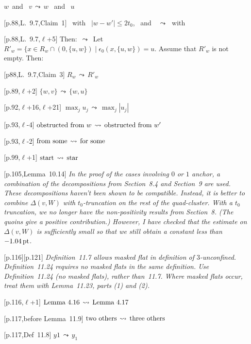 \documentclass[11pt]{amsart}
\def\op#1{{\text{#1}}}
\def\lto{\ensuremath{\,\leadsto\,}}
\def\line{$\ell$}
\def\text{\hbox}
\def\sz{small} %
\begin{document}
\begin{\sz}
[p.88,Lemma~9.7,\line+2] 
	$w$\text{ and } $v$\lto $w$ \text{ and } $u$

	
[p.88,L.~9.7,Claim~1]
	\text{ with } $|w - w'|\le 2t_0$, \text{ and }
	\lto \text{ with }

	
[p.88,L.~9.7,\line+5]
         Then: $\lto$ Let
          $
          R'_w = \{x\in R_w \cap(0,\{u,w\})\mid 
          \epsilon_0(x,\{u,w\}) = u.
          $
          Assume that $R'_w$ is not empty. Then:

[p88,L.~9.7,Claim~3]
        $R_w \lto R'_w$

[p.89,\line+2]
	$
	\{w,v\}\lto\{w,u\}
	$

[p.92,\line+16,\line+21]
   $     \max_j u_j \lto \max_j |u_j|$
	
[p.93,\line-4]
	$
	\text{obstructed from }w \lto
	\text{obstructed from }w'
	$
		
[p.93,\line-2]
	$
	\text{from some} \lto \text{for some}
	$

[p.99,\line+1]
        $
        \text{start} \lto \text{star}
        $

[p.105,Lemma~10.14]  {\it In the proof of the cases involving
   $0$ or $1$ anchor, a combination of the decompositions from
   Section~8.4 and Section~9 are used.  These decompositions haven't
   been shown to be compatible.  
   Instead, it is better to combine
   $\Delta(v,W)$ with $t_0$-truncation on the rest of the quad-cluster.
   With a $t_0$ truncation, we no longer have the non-positivity results
   from Section~8.  (The quoins give a positive contribution.) However,
   I have checked that
   the estimate on $\Delta(v,W)$ is sufficiently small so that we still
   obtain a constant less than $-1.04\,\op{pt}$.}
   

[p.116][p.121] {\it Definition~11.7 allows masked
flat in definition of $3$-unconfined.
Definition~11.24 requires no masked flats
in the same definition.  Use Definition~11.24 (no masked flats), rather than~11.7.  
Where masked flats occur,
treat them with Lemma~11.23, parts (1) and (2).}

[p.116,\line+1] 
	$
	\text{Lemma}~4.16 \lto \text{Lemma}~4.17
	$

[p.117,before Lemma~11.9]
	$
	\text{two others} \lto \text{three others}
	$
	
[p.117,Def~11.8]
    $
    y1 \lto y_1
    $
    

\end{\sz}
\end{document}

